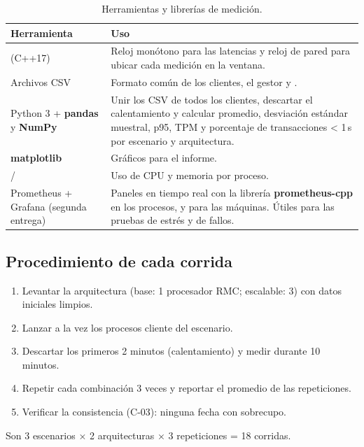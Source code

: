 \begin{table}[H]
\centering
\caption{Herramientas y librerías de medición.}
\begin{tabularx}{\textwidth}{p{4.4cm}Y}
\toprule
Herramienta & Uso \\
\midrule
{} (C++17) & Reloj monótono para las latencias y reloj de pared
para ubicar cada medición en la ventana. \\
Archivos CSV & Formato común de los clientes, el gestor y . \\
Python 3 + \textbf{pandas} y \textbf{NumPy} & Unir los CSV de todos los clientes,
descartar el calentamiento y calcular promedio, desviación estándar muestral, p95,
TPM y porcentaje de transacciones < 1\,s por escenario y arquitectura. \\
\textbf{matplotlib} & Gráficos para el informe. \\
 /  & Uso de CPU y memoria por proceso. \\
Prometheus + Grafana (segunda entrega) & Paneles en tiempo real con la librería
\textbf{prometheus-cpp} en los procesos, y  para las
máquinas. Útiles para las pruebas de estrés y de fallos. \\
\bottomrule
\end{tabularx}
\end{table}

\subsection{Procedimiento de cada corrida}

\begin{enumerate}
    \item Levantar la arquitectura (base: 1 procesador RMC; escalable: 3) con datos
          iniciales limpios.
    \item Lanzar a la vez los procesos cliente del escenario.
    \item Descartar los primeros 2 minutos (calentamiento) y medir durante 10 minutos.
    \item Repetir cada combinación 3 veces y reportar el promedio de las repeticiones.
    \item Verificar la consistencia (C-03): ninguna fecha con sobrecupo.
\end{enumerate}

Son 3 escenarios $\times$ 2 arquitecturas $\times$ 3 repeticiones = 18 corridas.

